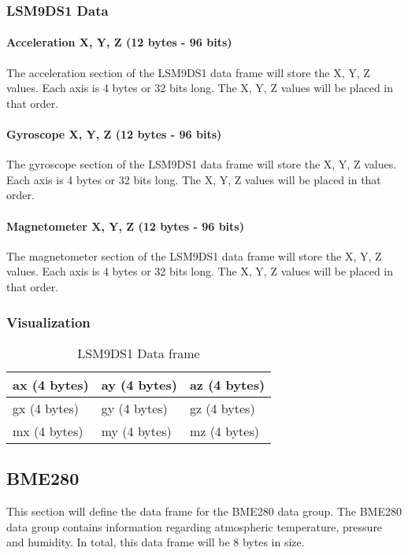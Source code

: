 \documentclass{article}
\begin{document}
  \subsubsection{LSM9DS1 Data}
  \paragraph{Acceleration X, Y, Z (12 bytes - 96 bits)}
  The acceleration section of the LSM9DS1 data frame will store the X, Y, Z values. Each axis is 4 bytes or 32 bits long. The X, Y, Z values will be placed in that order.
  \paragraph{Gyroscope X, Y, Z (12 bytes - 96 bits)}
  The gyroscope section of the LSM9DS1 data frame will store the X, Y, Z values. Each axis is 4 bytes or 32 bits long. The X, Y, Z values will be placed in that order.
  \paragraph{Magnetometer X, Y, Z (12 bytes - 96 bits)}
  The magnetometer section of the LSM9DS1 data frame will store the X, Y, Z values. Each axis is 4 bytes or 32 bits long. The X, Y, Z values will be placed in that order.
  \subsubsection{Visualization}
  
  \begin{table}[h]
  \centering
  \caption{LSM9DS1 Data frame}
  \begin{tabular}{|l|l|l|l|l|l|l|l|l|l|l|l|}
  \hline
  \multicolumn{4}{|l|}{ax (4 bytes)} & \multicolumn{4}{l|}{ay (4 bytes)} & \multicolumn{4}{l|}{az (4 bytes)} \\ \hline
  \multicolumn{4}{|l|}{gx (4 bytes)} & \multicolumn{4}{l|}{gy (4 bytes)} & \multicolumn{4}{l|}{gz (4 bytes)} \\ \hline
  \multicolumn{4}{|l|}{mx (4 bytes)} & \multicolumn{4}{l|}{my (4 bytes)} & \multicolumn{4}{l|}{mz (4 bytes)} \\ \hline
  \end{tabular}
  \end{table}

  \subsection{BME280}
  This section will define the data frame for the BME280 data group. The BME280 data group contains information regarding atmospheric temperature, pressure and humidity. In total, this data frame will be 8 bytes in size.
\end{document}

